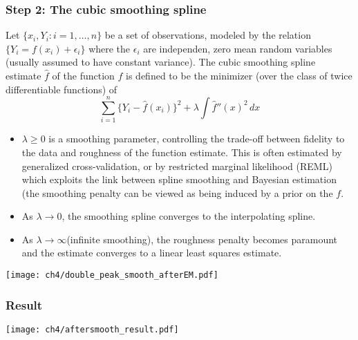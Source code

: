 \subsubsection{Step 2: The cubic smoothing spline}
\begin{definition}
    Let  $\{x_{i},Y_{i}:i=1,\dots ,n\}$ be a set of observations, modeled by the relation $\{Y_{i}=f(x_{i})+\epsilon _{i}\}$ where the $\epsilon _{i}$ are independen, zero mean random variables (usually assumed to have constant variance). The cubic smoothing spline estimate $\hat{f}$ of the function $f$ is defined to be the minimizer (over the class of twice differentiable functions) of
    \begin{equation}
         \sum _{i=1}^{n}\{Y_{i}-{\hat {f}}(x_{i})\}^{2}+\lambda \int {\hat {f}}''(x)^{2}\,dx
    \end{equation}
    \begin{itemize}
        \item $\lambda \geq 0$ is a smoothing parameter, controlling the trade-off between fidelity to the data and roughness of the function estimate. This is often estimated by generalized cross-validation, or by restricted marginal likelihood (REML) which exploits the link between spline smoothing and Bayesian estimation (the smoothing penalty can be viewed as being induced by a prior on the $f$.
        \item As $ \lambda \to 0$, the smoothing spline converges to the interpolating spline.
        \item As $\lambda \to \infty$(infinite smoothing), the roughness penalty becomes paramount and the estimate converges to a linear least squares estimate.
    \end{itemize}
\end{definition}
\begin{center}
    \texttt{[image: ch4/double\_peak\_smooth\_afterEM.pdf]}   
\end{center}

\subsubsection{Result}
\begin{center}
    \texttt{[image: ch4/aftersmooth\_result.pdf]}   
\end{center}
